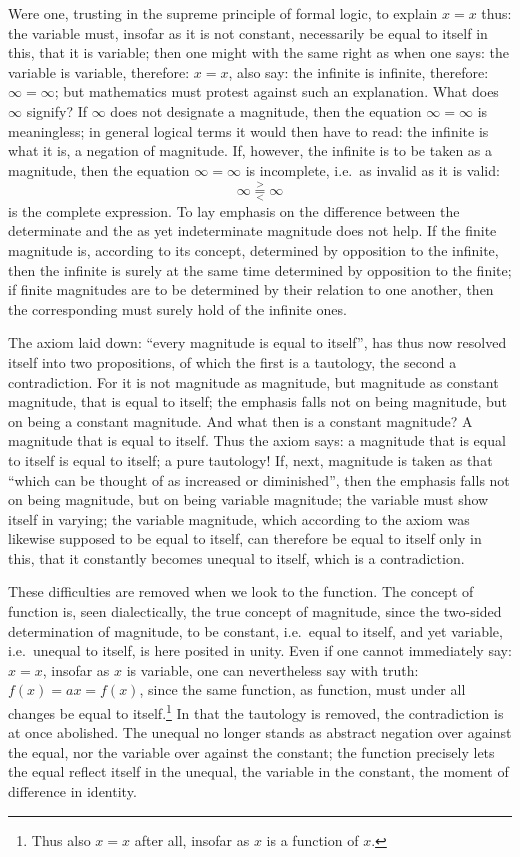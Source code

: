 \documentclass[12pt,a4paper,openany]{book}
\newcommand{\opage}[1]{\marginnote{\footnotesize\textit{[#1]}}}
\begin{document}
\setcounter{footnote}{0}%
\opage{6}Were one, trusting in the supreme principle of formal logic,
to explain $x=x$ thus: the variable must, insofar as
it is not constant, necessarily be equal to itself in this, that
it is variable; then one might with the same right as when one
says: the variable is variable, therefore: $x=x$, also
say: the infinite is infinite, therefore: $\infty=\infty$; but
mathematics must protest against such an explanation. What
does $\infty$ signify? If $\infty$ does not designate a magnitude, then the
equation $\infty=\infty$ is meaningless; in general logical terms it would then have to
read: the infinite is what it is, a negation of magnitude.
If, however, the infinite is to be taken as
a magnitude, then the equation $\infty=\infty$ is incomplete, i.e.\
as invalid as it is valid:
\[ \infty \overset{>}{\underset{<}{=}} \infty \]
is the complete
expression. To lay emphasis on the difference between the
determinate and the as yet indeterminate magnitude does not help.
If the finite magnitude is, according to its concept, determined by opposition
to the infinite, then the infinite is surely at the same time
determined by opposition to the finite; if finite
magnitudes are to be determined by their relation to one another,
then the corresponding must surely hold of the
infinite ones.

The axiom laid down: ``every magnitude is equal to itself'',
has thus now resolved itself into two propositions, of which
the first is a tautology, the second a contradiction. For it
is not magnitude as magnitude, but magnitude
as constant magnitude, that is equal to itself; the emphasis falls
not on being magnitude, but on being a
constant magnitude. And what then is a constant magnitude?
A magnitude that is equal to itself. Thus the axiom says:
a magnitude that is equal to itself is equal to itself; a pure
tautology! If, next, magnitude is taken as that ``which
can be thought of as increased or diminished'', then the emphasis falls
not on being magnitude, but on being variable
\setcounter{footnote}{0}%
\opage{7}magnitude; the variable must show itself in varying; the variable
magnitude, which according to the axiom was likewise supposed to be equal to itself,
can therefore be equal to itself only in this, that it constantly
becomes unequal to itself, which is a contradiction.

These difficulties are removed when we look to the function.
The concept of function is, seen dialectically, the true concept of magnitude,
since the two-sided determination of magnitude, to
be constant, i.e.\ equal to itself, and yet variable, i.e.\ unequal to
itself, is here posited in unity. Even if one cannot immediately
say: $x=x$, insofar as $x$ is variable, one can nevertheless
say with truth: $f(x)=ax=f(x)$, since the same
function, as function, must under all changes be
equal to itself.\footnote[1]{Thus also $x=x$ after all, insofar as $x$ is a function of $x$.} In that the tautology is removed, the contradiction
is at once abolished. The unequal no longer
stands as abstract negation over against the equal, nor the variable
over against the constant; the function precisely lets the equal
reflect itself in the unequal, the variable in the constant, the moment of difference
in identity.
\end{document}
